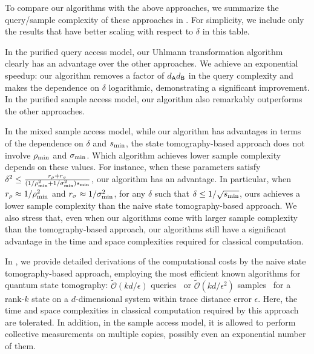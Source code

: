 To compare our algorithms with the above approaches,
we summarize the query/sample complexity of these approaches in .
For simplicity, we include only the results that have better scaling with respect to $\delta$ in this table.






In the purified query access model, our Uhlmann transformation algorithm clearly has an advantage over the other approaches.
We achieve an exponential speedup: our algorithm removes a factor of $d_{\mathsf{A}} d_{\mathsf{B}}$ in the query complexity and makes the dependence on $\delta$ logarithmic, demonstrating a significant improvement.
In the purified sample access model, our algorithm also remarkably outperforms the other approaches.

In the mixed sample access model, while our algorithm has advantages in terms of the dependence on $\delta$ and $s_{\rm min}$, the state tomography-based approach does not involve $\rho_{\rm min}$ and $\sigma_{\rm min}$.
Which algorithm achieves lower sample complexity depends on these values.
For instance, when these parameters satisfy $\delta^2 \leq \frac{r_\rho + r_\sigma}{(1/\rho_{\rm min}^2 + 1/\sigma_{\rm min}^2)s_{\rm min}}$, our algorithm has an advantage.
In particular, when $r_\rho \approx 1/\rho_{\rm min}^2$ and $r_\sigma \approx 1/\sigma_{\rm min}^2$, for any $\delta$ such that $\delta \leq 1/\sqrt{s_{\rm min}}$, ours achieves a lower sample complexity than the naive state tomography-based approach.
We also stress that, even when our algorithms come with larger sample complexity than the tomography-based approach, our algorithms still have a significant advantage in the time and space complexities required for classical computation.


In , we provide detailed derivations of the computational costs by the naive state tomography-based approach, employing the most efficient known algorithms for quantum state tomography: $\tilde{\mathcal{O}}(kd/\epsilon)$ queries~\cite{Apeldoorn2023TomoPurifQuery} or $\tilde{\mathcal{O}}(kd/\epsilon^2)$ samples~\cite{ODonnell2016EffTomo, Haah2017samploptTomo} for a rank-$k$ state on a $d$-dimensional system within trace distance error $\epsilon$.
Here, the time and space complexities in classical computation required by this approach are tolerated. 
In addition, in the sample access model, it is allowed to perform collective measurements on multiple copies, possibly even an exponential number of them.


